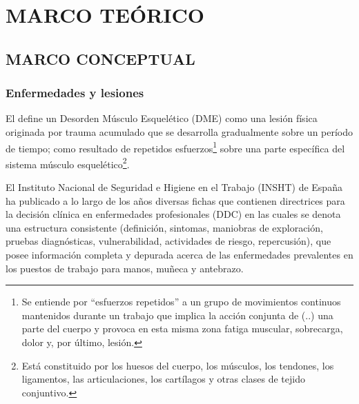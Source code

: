 \chapter{MARCO TEÓRICO}
\section{MARCO CONCEPTUAL}



\subsection{Enfermedades y lesiones}
El \parencite{MinisteriodeProteccionSocialdeColombia2006GuiaSuperiores} define un Desorden Músculo Esquelético (DME) como una lesión física originada por trauma acumulado que se desarrolla gradualmente sobre un período de tiempo; como resultado de repetidos esfuerzos\footnote{Se entiende por “esfuerzos repetidos” a un grupo de movimientos continuos mantenidos durante un trabajo que implica la acción conjunta de (..) una parte del cuerpo y provoca en esta misma zona fatiga muscular, sobrecarga, dolor y, por último, lesión.\parencite{INSHT2016PrevencionRepetidos}} sobre una parte específica del sistema músculo esquelético\footnote{Está constituido por los huesos del cuerpo, los músculos, los tendones, los ligamentos, las articulaciones, los cartílagos y otras clases de tejido conjuntivo.}. 

El Instituto Nacional de Seguridad e Higiene en el Trabajo (INSHT) de España ha publicado a lo largo de los años diversas fichas que contienen directrices para la decisión clínica en enfermedades profesionales (DDC) en las cuales se denota una estructura consistente (definición, sintomas, maniobras de exploración, pruebas diagnósticas, vulnerabilidad, actividades de riesgo, repercusión), que posee información completa y depurada acerca de las enfermedades prevalentes en los puestos de trabajo para manos, muñeca y antebrazo.


